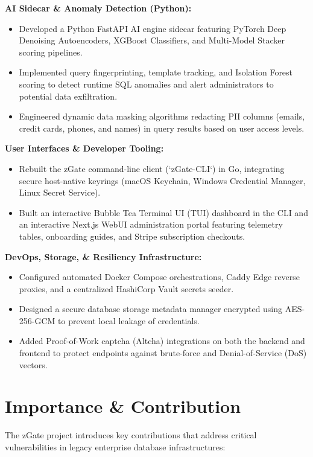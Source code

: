\textbf{AI Sidecar \& Anomaly Detection (Python):}
\begin{itemize}
    \item Developed a Python FastAPI AI engine sidecar featuring PyTorch Deep Denoising Autoencoders, XGBoost Classifiers, and Multi-Model Stacker scoring pipelines.
    \item Implemented query fingerprinting, template tracking, and Isolation Forest scoring to detect runtime SQL anomalies and alert administrators to potential data exfiltration.
    \item Engineered dynamic data masking algorithms redacting PII columns (emails, credit cards, phones, and names) in query results based on user access levels.
\end{itemize}

\textbf{User Interfaces \& Developer Tooling:}
\begin{itemize}
    \item Rebuilt the zGate command-line client (`zGate-CLI`) in Go, integrating secure host-native keyrings (macOS Keychain, Windows Credential Manager, Linux Secret Service).
    \item Built an interactive Bubble Tea Terminal UI (TUI) dashboard in the CLI and an interactive Next.js WebUI administration portal featuring telemetry tables, onboarding guides, and Stripe subscription checkouts.
\end{itemize}

\textbf{DevOps, Storage, \& Resiliency Infrastructure:}
\begin{itemize}
    \item Configured automated Docker Compose orchestrations, Caddy Edge reverse proxies, and a centralized HashiCorp Vault secrets seeder.
    \item Designed a secure database storage metadata manager encrypted using AES-256-GCM to prevent local leakage of credentials.
    \item Added Proof-of-Work captcha (Altcha) integrations on both the backend and frontend to protect endpoints against brute-force and Denial-of-Service (DoS) vectors.
\end{itemize}

\section{Importance \& Contribution}

The zGate project introduces key contributions that address critical vulnerabilities in legacy enterprise database infrastructures:

